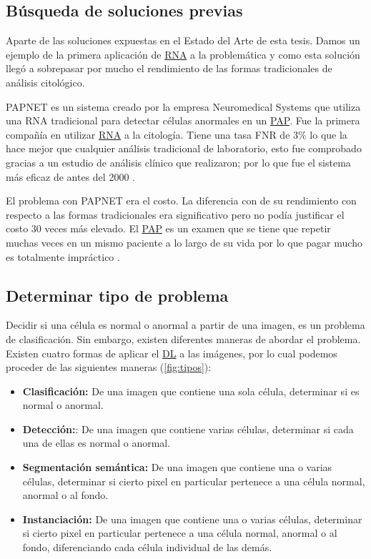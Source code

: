 \subsection{Búsqueda de soluciones previas}

Aparte de las soluciones expuestas en el Estado del Arte de esta tesis. Damos un
ejemplo de la primera aplicación de \hyperlink{abbr}{RNA} a la problemática y
como esta solución llegó a sobrepasar por mucho el rendimiento de las formas
tradicionales de análisis citológico. 

PAPNET es un sistema creado por la empresa Neuromedical Systems que utiliza una
RNA tradicional para detectar células anormales en un \hyperlink{abbr}{PAP}. Fue
la primera compañía en utilizar \hyperlink{abbr}{RNA} a la citología. Tiene una tasa FNR de 3\% lo
que la hace mejor que cualquier análisis tradicional de laboratorio, esto fue
comprobado gracias a un estudio de análisis clínico que realizaron; por lo que
fue el sistema más eficaz de antes del 2000 \cite{DeCresce1991}.

El problema con PAPNET era el costo. La diferencia con de su rendimiento con
respecto a las formas tradicionales era significativo pero no podía justificar
el costo 30 veces más elevado. El \hyperlink{abbr}{PAP} es un examen que se
tiene que repetir muchas veces en un mismo paciente a lo largo de su vida por lo
que pagar mucho es totalmente impráctico \cite{Media}. 

\subsection{Determinar tipo de problema}

Decidir si una célula es normal o anormal a partir de una imagen, es un problema
de clasificación. Sin embargo, existen diferentes maneras de abordar el
problema. Existen cuatro formas de aplicar el \hyperlink{abbr}{DL} a las
imágenes, por lo cual podemos proceder de las siguientes maneras (\autoref{fig:tipos}):

\begin{itemize}
    \item{\textbf{Clasificación:}} De una imagen que contiene una sola célula,
    determinar si es normal o anormal.
    \item{\textbf{Detección:}}: De una imagen que contiene varias células,
    determinar si cada una de ellas es normal o anormal.
    \item{\textbf{Segmentación semántica:}} De una imagen que contiene una o
    varias células, determinar si cierto pixel en particular pertenece a una
    célula normal, anormal o al fondo.
    \item{\textbf{Instanciación:}} De una imagen que contiene una o varias
    células, determinar si cierto pixel en particular pertenece a una célula
    normal, anormal o al fondo, diferenciando cada célula individual de las
    demás. 
\end{itemize}

